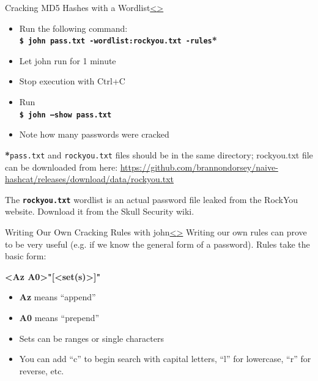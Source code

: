 \documentclass[12pt]{extarticle}
\newcommand{\code}[1]{\texttt{\bfseries#1}}
\newenvironment{instructionblock}{\Large\bgroup}{\egroup}
\begin{document}
\pagebreak
\begin{slide}{Cracking MD5 Hashes with a Wordlist}{\hyperref[slide 10]{\textless}\hyperref[slide 12]{\textgreater}}
	\vskip 10pt
	\begin{instructionblock}
		\begin{itemize}
			\item Run the following command:\\
				\code{\$ john pass.txt -wordlist:rockyou.txt -rules}\textbf{*}
			\item Let john run for 1 minute
			\item Stop execution with Ctrl+C
			\item Run \\
				\code{\$ john --show pass.txt}
			\item Note how many passwords were cracked
		\end{itemize}
	\end{instructionblock}
\end{slide}
\textbf{*}\texttt{pass.txt} and \texttt{rockyou.txt} files should be in the same directory; rockyou.txt file can be downloaded from here: {\url{https://github.com/brannondorsey/naive-hashcat/releases/download/data/rockyou.txt}}
\vfill

The \code{rockyou.txt} wordlist is an actual password file leaked from the RockYou website. Download it from the Skull Security wiki. \cite{rockyou}

\pagebreak
\begin{slide}{Writing Our Own Cracking Rules with john}{\hyperref[slide 11]{\textless}\hyperref[slide 13]{\textgreater}}
	\begin{instructionblock}
	Writing our own rules can prove to be very useful (e.g. if we know the general form of a password). Rules take the basic form: 
		
			\hskip 50pt \textbf{\textless Az \textbar  A0\textgreater"[\textless set(s)\textgreater ]"}

		\begin{itemize}
			\item \textbf{Az} means ``append''
			\item \textbf{A0} means ``prepend''
			\item Sets can be ranges or single characters
			\item You can add ``c'' to begin search with capital letters, ``l'' for lowercase, ``r'' for reverse, etc. \cite{cheat}
			
		\end{itemize}
	\end{instructionblock}
\end{slide}
\vfill
\end{document}
